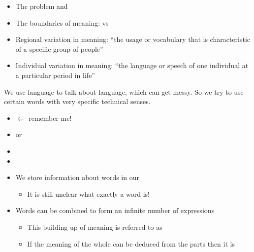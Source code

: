 \documentclass[a4paper,landscape,headrule,footrule,xetex,25pt]{foils}
\begin{document}

\begin{itemize}
\item The  problem and 
\item The boundaries of meaning:  vs 
\item Regional variation in meaning:  ``the usage or vocabulary that is characteristic of a specific group of people''
\item Individual variation in meaning: 
 ``the language or speech of one individual at a particular period in life''
\end{itemize}


We use language to talk about language, which can get messy.  So we
try to use certain words with very specific technical senses.

\begin{itemize}
\item {} $\leftarrow$ remember me!
\item {} or 
\item {}
\item {}
\end{itemize}


\begin{itemize}
\item We store information about words in our 
  \begin{itemize}
  \item It is still unclear what exactly a word is!
  \end{itemize}
\item Words can be combined to form an infinite number of expressions
  \begin{itemize}
  \item This building up of meaning is referred to as 
  \item If the meaning of the whole can be deduced from the parts then it is 
  \end{itemize}
\end{itemize}

\end{document}
